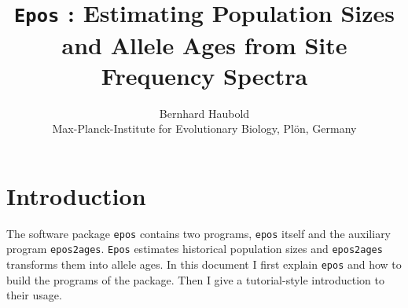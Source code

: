 \documentclass[a4paper, english]{article}
\newcommand{\ty}{\texttt}
\begin{document}
\title{\ty{Epos} : Estimating Population Sizes and Allele Ages from
  Site Frequency Spectra}
\author{Bernhard Haubold\\\small Max-Planck-Institute for Evolutionary
  Biology, Pl\"on, Germany}
\date{}
\maketitle

\tableofcontents

\section{Introduction} 
The software package \ty{epos} contains two programs, \ty{epos}
itself and the auxiliary program \ty{epos2ages}. \ty{Epos} estimates historical population
sizes and \ty{epos2ages} transforms them into allele ages. In this document I first
explain \ty{epos} and how to build the programs of the package. Then I
give a tutorial-style introduction to their usage.
\end{document}
